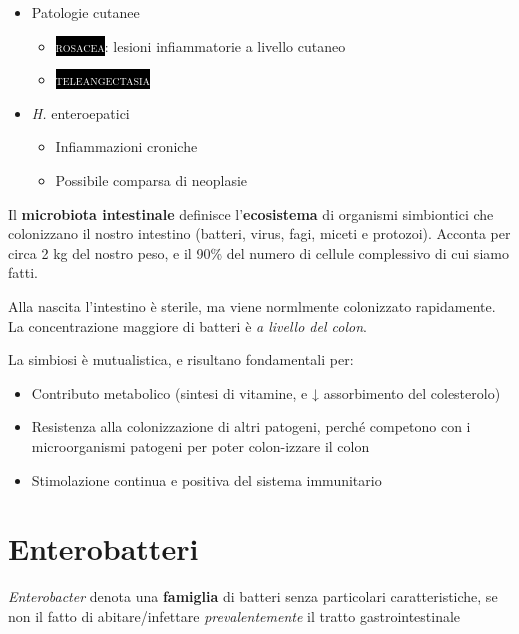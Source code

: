 \documentclass[italian,]{article}
\providecommand{\tightlist}{%
  \setlength{\itemsep}{0pt}\setlength{\parskip}{0pt}}
\newcommand{\pat}[1]{\colorbox{black}{\textcolor{white}{\textsc{#1}}}}
\newcommand{\greenbox}[2]{\begin{tcolorbox}[title=#1,colback=green!5,colframe=green!35!black]#2\end{tcolorbox}} %
\begin{document}
\begin{itemize}
\tightlist
\item
  Patologie cutanee

  \begin{itemize}
  \item
    \pat{rosacea}: lesioni infiammatorie a livello cutaneo
  \item
    \pat{teleangectasia}
  \end{itemize}
\item
  \emph{H.} enteroepatici

  \begin{itemize}
  \tightlist
  \item
    Infiammazioni croniche
  \item
    Possibile comparsa di neoplasie
  \end{itemize}
\end{itemize}

\greenbox{Microbiota intestinale}{
Il \textbf{microbiota intestinale} definisce l'\textbf{ecosistema} di
organismi simbiontici che colonizzano il nostro intestino (batteri,
virus, fagi, miceti e protozoi). Acconta per circa 2 kg del nostro peso,
e il 90\% del numero di cellule complessivo di cui siamo fatti.

Alla nascita l'intestino è sterile, ma viene normlmente colonizzato
rapidamente. La concentrazione maggiore di batteri è \emph{a livello del
colon}.

La simbiosi è mutualistica, e risultano fondamentali per:

\begin{itemize}
\tightlist
\item
  Contributo metabolico (sintesi di vitamine, e ↓ assorbimento del
  colesterolo)
\item
  Resistenza alla colonizzazione di altri patogeni, perché competono con
  i microorganismi patogeni per poter colon-izzare il colon
\item
  Stimolazione continua e positiva del sistema immunitario
\end{itemize}
}

\hypertarget{enterobatteri}{%
\section{Enterobatteri}\label{enterobatteri}}

\footnotesize

\emph{Enterobacter} denota una \textbf{famiglia} di batteri senza
particolari caratteristiche, se non il fatto di abitare/infettare
\emph{prevalentemente} il tratto gastrointestinale \normalsize
\end{document}
